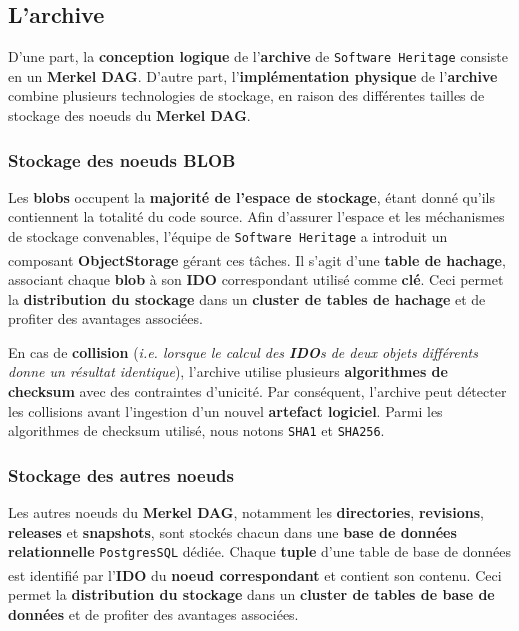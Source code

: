 \documentclass[12pt,a4paper]{report}
\theoremstyle{definition}
\begin{document}
\subsection{L'archive}
D'une part, la \textbf{conception logique} de l'\textbf{archive} de \texttt{Software Heritage} consiste en un \textbf{Merkel DAG}. D'autre part, l'\textbf{implémentation physique} de l'\textbf{archive} combine plusieurs technologies de stockage, en raison des différentes tailles de stockage des noeuds du \textbf{Merkel DAG}.

\subsubsection{Stockage des noeuds BLOB}
Les \textbf{blobs} occupent la \textbf{majorité de l'espace de stockage}, étant donné qu'ils contiennent la totalité du code source. Afin d'assurer l'espace et les méchanismes de stockage convenables, l'équipe de \texttt{Software Heritage} a introduit un composant \textbf{ObjectStorage} gérant ces tâches\textsuperscript{\citep{dicosmoWhyAndHow}}. Il s'agit d'une \textbf{table de hachage}, associant chaque \textbf{blob} à son \textbf{IDO} correspondant utilisé comme \textbf{clé}. Ceci permet la \textbf{distribution du stockage} dans un \textbf{cluster de tables de hachage} et de profiter des avantages associées.

En cas de \textbf{collision} (\textit{i.e. lorsque le calcul des \textbf{IDO}s de deux objets différents donne un résultat identique}), l'archive utilise plusieurs \textbf{algorithmes de checksum} avec des contraintes d'unicité. Par conséquent, l'archive peut détecter les collisions avant l'ingestion d'un nouvel \textbf{artefact logiciel}. Parmi les algorithmes de checksum utilisé, nous notons \texttt{SHA1} et \texttt{SHA256}.

\subsubsection{Stockage des autres noeuds}
Les autres noeuds du \textbf{Merkel DAG}, notamment les \textbf{directories}, \textbf{revisions}, \textbf{releases} et \textbf{snapshots}, sont stockés chacun dans une \textbf{base de données relationnelle} \texttt{PostgresSQL} dédiée. Chaque \textbf{tuple} d'une table de base de données est identifié par l'\textbf{IDO} du \textbf{noeud correspondant} et contient son contenu\textsuperscript{\citep{dicosmoWhyAndHow}}. Ceci permet la \textbf{distribution du stockage} dans un \textbf{cluster de tables de base de données} et de profiter des avantages associées.
\end{document}
